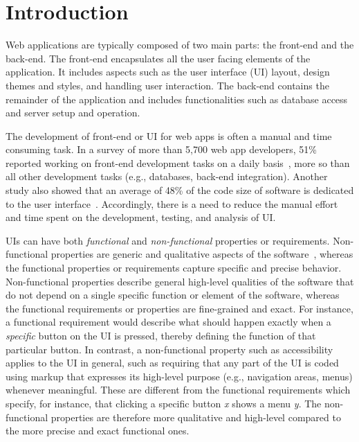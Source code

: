 
\chapter{Introduction}
\label{chp:intro}

Web applications are typically composed of two main parts:
the front-end and the back-end. 
The front-end encapsulates all the user facing
elements of the application.
It includes aspects such as the user interface (UI) layout,
design themes and styles, and handling user interaction.
The back-end contains the remainder of the application
and includes functionalities such as database access and
server setup and operation.

The development of front-end or UI for web apps
is often a manual and time consuming task.
In a survey of more than 5,700 web app developers,
51\% reported working on front-end development tasks on a
daily basis~\cite{IDC:survey}, more so than all
other development tasks (e.g., databases, back-end integration).
Another study also showed that an average of
48\% of the code size of software
is dedicated to the user interface~\cite{myers:ui:survey}. 
Accordingly, there is a need to reduce the manual effort and time 
spent on the development, testing, and analysis of UI. 
 
UIs can have both \emph{functional} and \emph{non-functional} properties or requirements. 
Non-functional properties are generic and qualitative aspects of the software~\cite{behutiye2017non,chung2012non}, 
whereas the functional properties or requirements capture specific and precise behavior. 
Non-functional properties describe general high-level qualities of the software that do not depend on a single specific function or element of the software, whereas the functional requirements or properties 
are fine-grained and exact. For instance, a functional requirement would describe what should happen exactly when a \emph{specific} button on the UI is pressed, thereby defining the function of that particular button.  In contrast, a non-functional property such as accessibility applies to the UI in general, such as requiring that any part of the UI is coded using markup that expresses its high-level purpose (e.g., navigation areas, menus) whenever meaningful. These are different from the functional requirements which specify, for instance, that clicking a specific button \emph{x} shows a menu \emph{y}. The non-functional properties are therefore more qualitative and high-level compared to the more precise and exact functional ones. 
 
